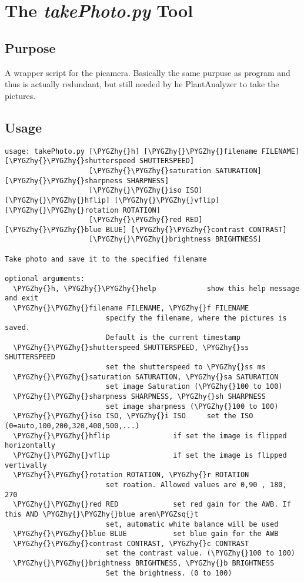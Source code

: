 \documentclass[a4paper,10pt,openany,oneside]{sphinxmanual}
\def\PYGZhy{\char`\-}
\def\PYGZsq{\char`\'}
\renewcommand\PYGZsq{\textquotesingle}
\begin{document}
\section{The \emph{takePhoto.py} Tool}
\label{index:the-takephoto-py-tool}

\subsection{Purpose}
\label{index:id1}
A wrapper script for the picamera. Basically the same purpuse as
 program and thus is actually redundant, but still needed by
he PlantAnalyzer to take the pictures.


\subsection{Usage}
\label{index:id2}
\begin{Verbatim}[commandchars=\\\{\}]
usage: takePhoto.py [\PYGZhy{}h] [\PYGZhy{}\PYGZhy{}filename FILENAME] [\PYGZhy{}\PYGZhy{}shutterspeed SHUTTERSPEED]
                    [\PYGZhy{}\PYGZhy{}saturation SATURATION] [\PYGZhy{}\PYGZhy{}sharpness SHARPNESS]
                    [\PYGZhy{}\PYGZhy{}iso ISO] [\PYGZhy{}\PYGZhy{}hflip] [\PYGZhy{}\PYGZhy{}vflip] [\PYGZhy{}\PYGZhy{}rotation ROTATION]
                    [\PYGZhy{}\PYGZhy{}red RED] [\PYGZhy{}\PYGZhy{}blue BLUE] [\PYGZhy{}\PYGZhy{}contrast CONTRAST]
                    [\PYGZhy{}\PYGZhy{}brightness BRIGHTNESS]

Take photo and save it to the specified filename

optional arguments:
  \PYGZhy{}h, \PYGZhy{}\PYGZhy{}help            show this help message and exit
  \PYGZhy{}\PYGZhy{}filename FILENAME, \PYGZhy{}f FILENAME
                        specify the filename, where the pictures is saved.
                        Default is the current timestamp
  \PYGZhy{}\PYGZhy{}shutterspeed SHUTTERSPEED, \PYGZhy{}ss SHUTTERSPEED
                        set the shutterspeed to \PYGZhy{}ss ms
  \PYGZhy{}\PYGZhy{}saturation SATURATION, \PYGZhy{}sa SATURATION
                        set image Saturation (\PYGZhy{}100 to 100)
  \PYGZhy{}\PYGZhy{}sharpness SHARPNESS, \PYGZhy{}sh SHARPNESS
                        set image sharpness (\PYGZhy{}100 to 100)
  \PYGZhy{}\PYGZhy{}iso ISO, \PYGZhy{}i ISO     set the ISO (0=auto,100,200,320,400,500,...)
  \PYGZhy{}\PYGZhy{}hflip               if set the image is flipped horizontally
  \PYGZhy{}\PYGZhy{}vflip               if set the image is flipped vertivally
  \PYGZhy{}\PYGZhy{}rotation ROTATION, \PYGZhy{}r ROTATION
                        set roation. Allowed values are 0,90 , 180, 270
  \PYGZhy{}\PYGZhy{}red RED             set red gain for the AWB. If this AND \PYGZhy{}\PYGZhy{}blue aren\PYGZsq{}t
                        set, automatic white balance will be used
  \PYGZhy{}\PYGZhy{}blue BLUE           set blue gain for the AWB
  \PYGZhy{}\PYGZhy{}contrast CONTRAST, \PYGZhy{}c CONTRAST
                        set the contrast value. (\PYGZhy{}100 to 100)
  \PYGZhy{}\PYGZhy{}brightness BRIGHTNESS, \PYGZhy{}b BRIGHTNESS
                        Set the brightness. (0 to 100)
\end{Verbatim}
\end{document}
